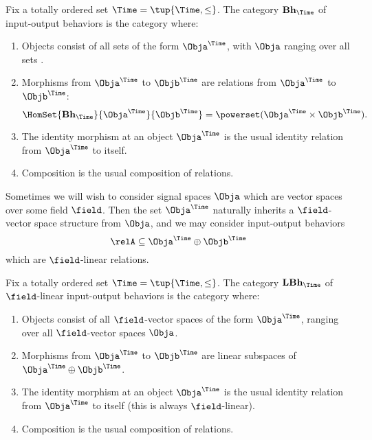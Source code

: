 \begin{definition}
    Fix a totally ordered set $\Time = \tup{\Time, \leq}$.
    The category $\textbf{Bh}_\Time$ of input-output behaviors is the category where:
    \begin{enumerate}
        \item Objects consist of all sets of the form $\Obja^\Time$, with $\Obja$ ranging over all sets .
        \item Morphisms from $\Obja^\Time$ to $\Objb^\Time$ are relations from $\Obja^\Time$ to $\Objb^\Time$:
              \begin{equation}
                  \HomSet{\textbf{Bh}_\Time}{\Obja^\Time}{\Objb^\Time} = \powerset (\Obja^\Time \times \Objb^\Time).
              \end{equation}
        \item The identity morphism at an object $\Obja^\Time$ is the usual identity relation from $\Obja^\Time$ to itself.
        \item Composition is the usual composition of relations.
    \end{enumerate}
\end{definition}

Sometimes we will wish to consider signal spaces $\Obja$ which are vector spaces over some field $\field$.
Then the set $\Obja^\Time$ naturally inherits a $\field$-vector space structure from $\Obja$, and we may consider input-output behaviors
\begin{equation*}
    \relA \subseteq \Obja^\Time \oplus \Objb^\Time
\end{equation*}
which are $\field$-linear relations.

\begin{definition}
    Fix a totally ordered set $\Time = \tup{\Time, \leq}$.
    The category $\textbf{LBh}_\Time$ of $\field$-linear input-output behaviors is the category where:
    \begin{enumerate}
        \item Objects consist of all $\field$-vector spaces of the form $\Obja^\Time$, ranging over all $\field$-vector spaces $\Obja$.
        \item Morphisms from $\Obja^\Time$ to $\Objb^\Time$ are linear subspaces of  $\Obja^\Time \oplus \Objb^\Time$.
        \item The identity morphism at an object $\Obja^\Time$ is the usual identity relation from $\Obja^\Time$ to itself (this is always $\field$-linear).
        \item Composition is the usual composition of relations.
    \end{enumerate}
\end{definition}



